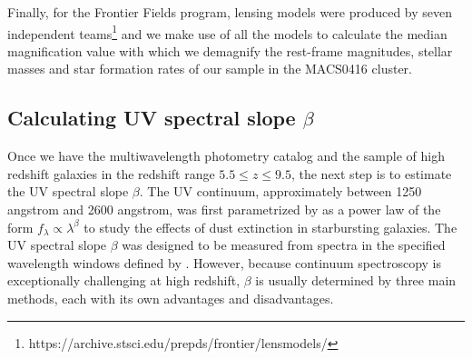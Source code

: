\documentclass[twocolumn]{aastex63}
\begin{document}
Finally, for the Frontier Fields program, lensing models were produced by seven independent teams\footnote[7]{https://archive.stsci.edu/prepds/frontier/lensmodels/} and we make use of all the models to calculate the median magnification value with which we demagnify the rest-frame magnitudes, stellar masses and star formation rates of our sample in the MACS0416 cluster.


\subsection{Calculating UV spectral slope $\beta$}\label{sec:betacal}
Once we have the multiwavelength photometry catalog and the sample of high redshift galaxies in the redshift range  $5.5\leq z\leq9.5$, the next step is to estimate the UV spectral slope $\beta$. The UV continuum, approximately between 1250 angstrom and 2600 angstrom, was first parametrized by \citet{Calzetti1994} as a power law of the form $f_{\lambda}\propto\lambda^{\beta}$ to study the effects of dust extinction in starbursting galaxies. The UV spectral slope $\beta$ was designed to be measured from spectra in the specified wavelength windows defined by \citet{Calzetti1994}. However, because continuum spectroscopy is exceptionally challenging at high redshift, $\beta$ is usually determined by three main methods, each with its own advantages and disadvantages.
\end{document}
